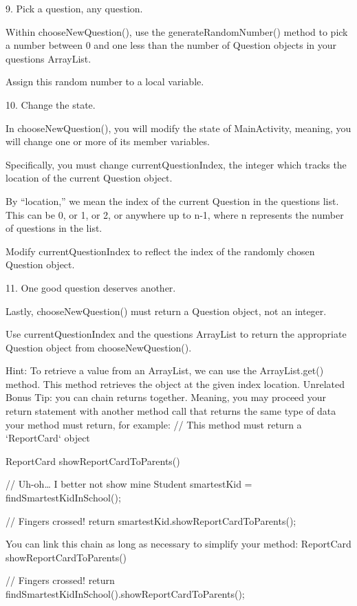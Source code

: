     9.
    Pick a question, any question.

    Within chooseNewQuestion(), use the generateRandomNumber() method to pick a number between 0 and one less than the number of Question objects in your questions ArrayList.

    Assign this random number to a local variable.

    10.
    Change the state.

    In chooseNewQuestion(), you will modify the state of MainActivity, meaning, you will change one or more of its member variables.

    Specifically, you must change currentQuestionIndex, the integer which tracks the location of the current Question object.

    By “location,” we mean the index of the current Question in the questions list. This can be 0, or 1, or 2, or anywhere up to n-1, where n represents the number of questions in the list.

    Modify currentQuestionIndex to reflect the index of the randomly chosen Question object.

    11.
    One good question deserves another.

    Lastly, chooseNewQuestion() must return a Question object, not an integer.

    Use currentQuestionIndex and the questions ArrayList to return the appropriate Question object from chooseNewQuestion().

        Hint: To retrieve a value from an ArrayList, we can use the ArrayList.get() method. This method retrieves the object at the given index location.
            Unrelated Bonus Tip: you can chain returns together. Meaning, you may proceed your return statement with another method call that returns the same type of data your method must return, for example:
                // This method must return a `ReportCard` object
                
                ReportCard showReportCardToParents() {
                
                    // Uh-oh… I better not show mine
                    Student smartestKid = findSmartestKidInSchool();
                
                    // Fingers crossed!
                    return smartestKid.showReportCardToParents();
                
                }
            You can link this chain as long as necessary to simplify your method:
                ReportCard showReportCardToParents() {
                
                    // Fingers crossed!
                    return findSmartestKidInSchool().showReportCardToParents();
                
                }

